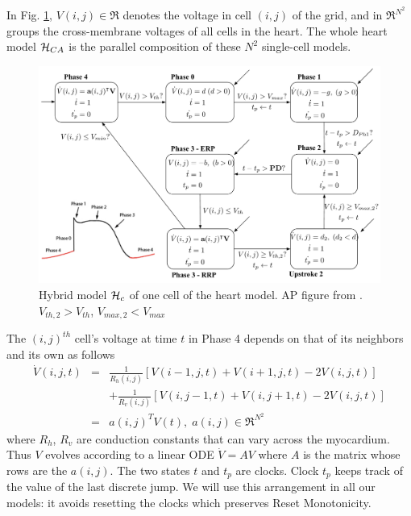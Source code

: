 In Fig. \ref{fig:cellaut}, $V(i,j) \in \Re$ denotes the voltage in cell $(i,j)$ of the grid, and  in $\Re^{N^2}$ groups the cross-membrane voltages of all cells in the heart.
The whole heart model $\mathcal{H}_{CA}$ is the parallel composition of these $N^2$ single-cell models. 
\begin{figure}[t]
	\centering
	\includegraphics[scale=0.26]{figures/cellaut1v2}
	\vspace{-10pt}
	\caption{Hybrid model $\mathcal{H}_c$ of one cell of the heart model. AP figure from \cite{eplab}. 
		$V_{th,2}>V_{th}$, $V_{max,2}<V_{max}$}
	\vspace{-20pt}
	\label{fig:cellaut}
\end{figure}
%
The $(i,j)^{th}$ cell's voltage at time $t$ in Phase 4 depends on that of its neighbors and its own as follows \cite{Spector11_Emergence}
\begin{eqnarray}
\dot{V}(i,j,t) &=& \frac{1}{R_h(i,j)}[V(i-1,j,t)+V(i+1,j,t) - 2V(i,j,t)] 
\nonumber \\ 
&& +  \frac{1}{R_v(i,j)}[V(i,j-1,t) +  V(i,j+1,t) - 2V(i,j,t)]  
\nonumber\\
&=& a(i,j)^TV(t), \; a(i,j) \in \Re^{N^2}
\;
\end{eqnarray}
where $R_h$, $R_v$ are conduction constants that can vary across the myocardium.
Thus $V$ evolves according to a linear ODE $\dot{V} = AV$ where $A$ is the matrix whose rows are the $a(i,j)$. 
The two states $t$ and $t_p$ are clocks.
Clock $t_{p}$ keeps track of the value of the last discrete jump. 
We will use this arrangement in all our models: it avoids resetting the clocks which preserves Reset Monotonicity.

